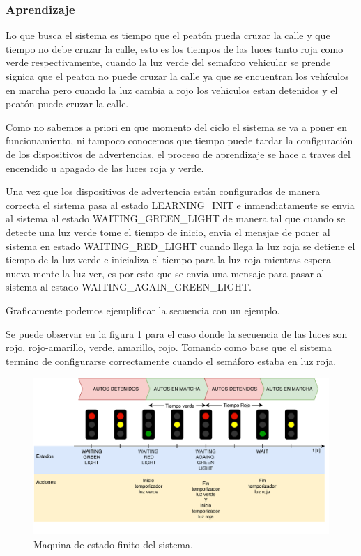 \subsubsection{Aprendizaje}
Lo que busca el sistema es tiempo que el peatón pueda cruzar la calle y  que tiempo no debe cruzar la calle, esto es los tiempos de las luces tanto roja como verde respectivamente, cuando la luz verde del semaforo vehicular se prende signica que el peaton no puede cruzar la calle ya que se encuentran los vehículos en marcha pero cuando la luz cambia a rojo los vehiculos estan detenidos y el peatón puede cruzar la calle.

Como no sabemos a priori en que momento del ciclo el sistema se va a poner en funcionamiento, ni tampoco conocemos que tiempo puede tardar la configuración de los dispositivos de advertencias, el proceso de aprendizaje se hace a traves del encendido u apagado de las luces roja y verde.

Una vez que los dispositivos de advertencia están configurados de manera correcta el sistema pasa al estado LEARNING\_INIT e inmendiatamente se envia al sistema al estado WAITING\_GREEN\_LIGHT  de manera tal que cuando se detecte una luz verde tome el tiempo de inicio, envia el mensjae de poner al sistema en estado WAITING\_RED\_LIGHT cuando llega la luz roja se detiene el tiempo de la luz verde e inicializa el tiempo para la luz roja mientras espera nueva mente la luz ver, es por esto que se envia una mensaje para pasar al sistema al estado WAITING\_AGAIN\_GREEN\_LIGHT. 

Graficamente podemos ejemplificar la secuencia con un ejemplo.

Se puede observar en la figura  \ref{fig:digramaGraficoCambioSemaforo} para el caso donde la secuencia de las luces son rojo, rojo-amarillo, verde, amarillo, rojo.
Tomando como base que el sistema termino de configurarse correctamente cuando el semáforo estaba en luz roja.

\begin{figure}[h]
	\centering
	\includegraphics[scale=.7]{./Figures/digramaGraficoCambioSemaforo.pdf}
	\caption{Maquina de estado finito del sistema.}
	\label{fig:digramaGraficoCambioSemaforo}
\end{figure}

